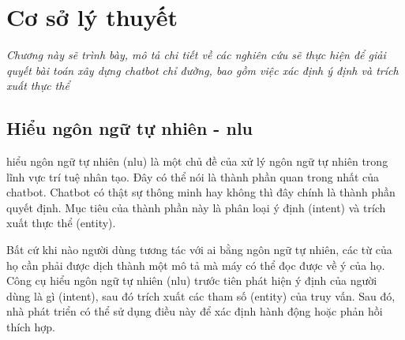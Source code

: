 \chapter{Cơ sở lý thuyết}
\label{Chapter3}

\emph{Chương này sẽ trình bày, mô tả chi tiết về các nghiên cứu sẽ thực hiện để giải quyết bài toán xây dựng chatbot chỉ đường, bao gồm việc xác định ý định và trích xuất thực thể}

\section{Hiểu ngôn ngữ tự nhiên - \ac{nlu}}

hiểu ngôn ngữ tự nhiên (\ac{nlu}) là một chủ đề của xử lý ngôn ngữ tự nhiên trong lĩnh vực trí tuệ nhân tạo. Đây có thể nói là thành phần quan trong nhất của chatbot. Chatbot có thật sự thông minh hay không thì đây chính là thành phần quyết định. Mục tiêu của thành phần này là phân loại ý định (intent) và trích xuất thực thể (entity).

Bất cứ khi nào người dùng tương tác với \ac{ai} bằng ngôn ngữ tự nhiên, các từ của họ cần phải được dịch thành một mô tả mà máy có thể đọc được về ý của họ.
Công cụ hiểu ngôn ngữ tự nhiên (\ac{nlu}) trước tiên phát hiện ý định của người dùng là gì (intent), sau đó trích xuất các tham số (entity) của truy vấn. Sau đó, nhà phát triển có thể sử dụng điều này để xác định hành động hoặc phản hồi thích hợp.

